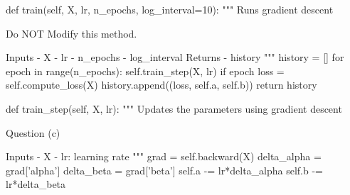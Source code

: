 \documentclass[10pt]{article}
\begin{document}
\begin{python}
    def train(self, X, lr, n_epochs, log_interval=10):
        """
        Runs gradient descent

        Do NOT Modify this method.

        Inputs
        - X
        - lr
        - n_epochs
        - log_interval
        Returns
        - history
        """
        history = []
        for epoch in range(n_epochs):
            self.train_step(X, lr)
            if epoch %
                loss = self.compute_loss(X)
                history.append((loss, self.a, self.b))
        return history

    

    def train_step(self, X, lr):
        """
        Updates the parameters using gradient descent

        Question (c)

        Inputs
        - X
        - lr: learning rate
        """
        grad = self.backward(X)
        delta_alpha = grad['alpha']
        delta_beta = grad['beta']
        self.a -= lr*delta_alpha
        self.b -= lr*delta_beta

\end{python}
\end{document}
